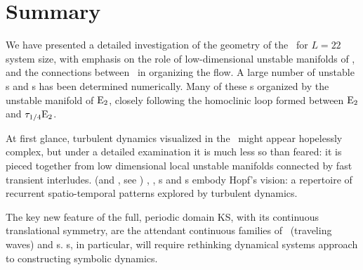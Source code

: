 
\section{Summary}
\label{sect:rpo-sum}

We have presented a detailed investigation
of the geometry of the
{\KS} \statesp\ for $L=22$ system size, with emphasis on the role of
low-dimensional unstable manifolds of \eqva,
 and the connections between \eqva\ in organizing the flow.
A large number of unstable \rpo s and \po s has been determined
numerically.
Many of these \rpo s
 organized by the unstable manifold of $\mathrm{E}_{2}$, closely
following the homoclinic loop formed between $\mathrm{E}_{2}$ and $\tau_{1/4}\mathrm{E}_{2}$.


At first glance, turbulent dynamics visualized in the \statesp\ might appear
hopelessly complex, but under a detailed examination it is
much less so than feared: it is
pieced together from low dimensional 
local unstable manifolds connected by fast transient interludes.
{\KS} (and \pCf, see )  \eqva, \reqva, \po s and
\rpo s embody Hopf's vision:
a repertoire of recurrent spatio-temporal
patterns explored by turbulent dynamics.


The key new feature of the full, periodic domain
KS, with its continuous translational symmetry,
are the attendant continuous families of
\reqva\ (traveling waves) and \rpo s.
\Rpo s, in particular, will require rethinking dynamical systems
approach to constructing symbolic dynamics.




